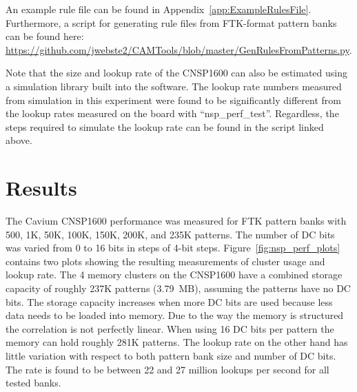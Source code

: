 \documentclass[preprint,prd,showpacs]{revtex4-1}
\begin{document}
An example rule file can be found in Appendix~\ref{app:ExampleRulesFile}. Furthermore, a script for generating rule files from FTK-format pattern banks can be found here: \url{https://github.com/jwebste2/CAMTools/blob/master/GenRulesFromPatterns.py}.

Note that the size and lookup rate of the CNSP1600 can also be estimated using a simulation library built into the software. The lookup rate numbers measured from simulation in this experiment were found to be significantly different from the lookup rates measured on the board with ``nsp\_perf\_test''. Regardless, the steps required to simulate the lookup rate can be found in the script linked above.


\section{Results}\label{sec:Results}

The Cavium CNSP1600 performance was measured for FTK pattern banks with 500, 1K, 50K, 100K, 150K, 200K, and 235K patterns. The number of DC bits was varied from 0 to 16 bits in steps of 4-bit steps. Figure~\ref{fig:nsp_perf_plots} contains two plots showing the resulting measurements of cluster usage and lookup rate. The 4 memory clusters on the CNSP1600 have a combined storage capacity of roughly 237K patterns (3.79~MB), assuming the patterns have no DC bits. The storage capacity increases when more DC bits are used because less data needs to be loaded into memory. Due to the way the memory is structured the correlation is not perfectly linear. When using 16 DC bits per pattern the memory can hold roughly 281K patterns. The lookup rate on the other hand has little variation with respect to both pattern bank size and number of DC bits. The rate is found to be between 22 and 27 million lookups per second for all tested banks.
\end{document}
